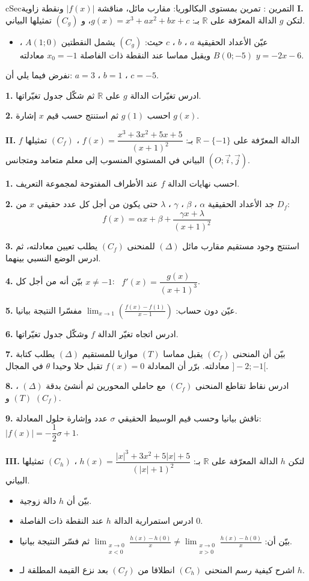 \documentclass[12pt,a4paper]{article}
\newenvironment{BOX}[2]{\begin{otherlanguage}{english}\begin{arbox}{#1}{#2}}{\end{arbox}\end{otherlanguage}}
\newcounter{exo}
\newenvironment{tamrin}[1]{\stepcounter{exo}\begin{BOX}{cSec}{التمرين \theexo: #1}}{\end{BOX}}
\newcommand{\R}{\mathbb{R}}
\newcommand{\QQ}[1]{\par\smallskip\textbf{#1.} }
\begin{document}
\begin{tamrin}{تمرين بمستوى البكالوريا: مقارب مائل، مناقشة $|f(x)|$ ونقطة زاوية}
\textbf{I.} لتكن $g$ الدالة المعرّفة على $\R$ بـ: $g(x)=x^{3}+ax^{2}+bx+c$، و $(C_g)$ تمثيلها البياني.
\begin{itemize}[label=$\spadesuit$]
\item عيّن الأعداد الحقيقية $a$ ، $b$ ، $c$ حيث: $(C_g)$ يشمل النقطتين $A(1;0)$ ، $B(0;-5)$ ويقبل مماسا عند النقطة ذات الفاصلة $x_0=-1$ معادلته $y=-2x-6$.
\end{itemize}
نفرض فيما يلي أن: $a=3$ ، $b=1$ ، $c=-5$.
\QQ{1} ادرس تغيّرات الدالة $g$ على $\R$ ثم شكّل جدول تغيّراتها.
\QQ{2} احسب $g(1)$ ثم استنتج حسب قيم $x$ إشارة $g(x)$.

\textbf{II.} $f$ الدالة المعرّفة على $\R-\{-1\}$ بـ: $f(x)=\dfrac{x^{3}+3x^{2}+5x+5}{(x+1)^{2}}$ ، $(C_f)$ تمثيلها البياني في المستوي المنسوب إلى معلم متعامد ومتجانس $(O;\vec i,\vec j)$.
\QQ{1} احسب نهايات الدالة $f$ عند الأطراف المفتوحة لمجموعة التعريف.
\QQ{2} جد الأعداد الحقيقية $\alpha$ ، $\beta$ ، $\gamma$ ، $\lambda$ حتى يكون من أجل كل عدد حقيقي $x$ من $D_f$: \[f(x)=\alpha x+\beta+\frac{\gamma x+\lambda}{(x+1)^{2}}\]
\QQ{3} استنتج وجود مستقيم مقارب مائل $(\Delta)$ للمنحنى $(C_f)$ يطلب تعيين معادلته، ثم ادرس الوضع النسبي بينهما.
\QQ{4} بيّن أنه من أجل كل $x\neq-1$: \ $f'(x)=\dfrac{g(x)}{(x+1)^{3}}$.
\QQ{5} عيّن دون حساب: $\displaystyle\lim_{x\to1}\left(\frac{f(x)-f(1)}{x-1}\right)$ مفسّرا النتيجة بيانيا.
\QQ{6} ادرس اتجاه تغيّر الدالة $f$ وشكّل جدول تغيّراتها.
\QQ{7} بيّن أن المنحنى $(C_f)$ يقبل مماسا $(T)$ موازيا للمستقيم $(\Delta)$ يطلب كتابة معادلته. برّر أن المعادلة $f(x)=0$ تقبل حلا وحيدا $\theta$ في المجال $]-2;-1[$.
\QQ{8} ادرس نقاط تقاطع المنحنى $(C_f)$ مع حاملي المحورين ثم أنشئ بدقة $(\Delta)$ ، $(T)$ و $(C_f)$.
\QQ{9} ناقش بيانيا وحسب قيم الوسيط الحقيقي $\sigma$ عدد وإشارة حلول المعادلة: \ $|f(x)|=-\dfrac12\sigma+1$.

\textbf{III.} لتكن $h$ الدالة المعرّفة على $\R$ بـ: $h(x)=\dfrac{|x|^{3}+3x^{2}+5|x|+5}{\left(|x|+1\right)^{2}}$ ، $(C_h)$ تمثيلها البياني.
\begin{itemize}[label=$\star$]
\item بيّن أن $h$ دالة زوجية.
\item ادرس استمرارية الدالة $h$ عند النقطة ذات الفاصلة $0$.
\item بيّن أن: $\displaystyle\lim_{\substack{x\to0\\x<0}}\frac{h(x)-h(0)}{x}\neq\lim_{\substack{x\to0\\x>0}}\frac{h(x)-h(0)}{x}$ ثم فسّر النتيجة بيانيا.
\item اشرح كيفية رسم المنحنى $(C_h)$ انطلاقا من $(C_f)$ بعد نزع القيمة المطلقة لـ $h$.
\end{itemize}
\end{tamrin}
\end{document}
